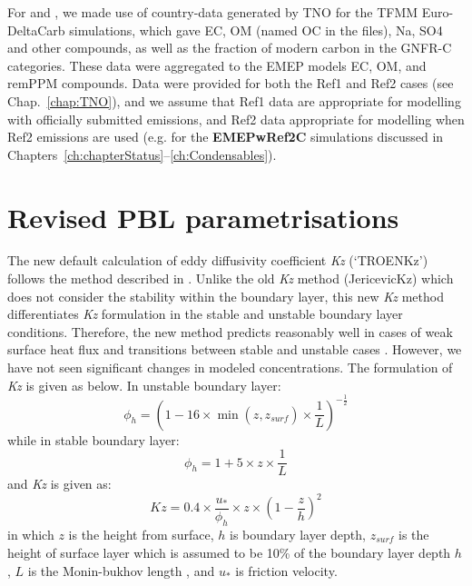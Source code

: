 
For \pmfine and \pmten, we made use of country-data generated by TNO for
the TFMM Euro-DeltaCarb simulations, which gave EC, OM (named
OC in the files), Na, SO4 and other compounds, as well as the fraction
of modern carbon in the GNFR-C categories. These data were aggregated
to the EMEP models EC, OM, and remPPM compounds. Data were provided for
both the Ref1 and Ref2 cases (see Chap.~\ref{chap:TNO}), and we assume
that Ref1 data are appropriate for modelling with officially submitted
emissions, and Ref2 data appropriate for modelling when Ref2 emissions
are used (e.g. for the \textbf{EMEPwRef2C} simulations discussed in
Chapters~\ref{ch:chapterStatus}--\ref{ch:Condensables}).



\section{Revised PBL parametrisations}
\label{sec:updateKz}

The new default calculation of eddy diffusivity coefficient \textit{Kz} (`TROENKz') follows the method described in \citet{troenkz}. Unlike the old \textit{Kz} method (JericevicKz) which does not consider the stability within the boundary layer, this new \textit{Kz} method differentiates \textit{Kz} formulation in the stable and unstable boundary layer conditions. Therefore, the new method predicts reasonably well in cases of weak surface heat flux and transitions between stable and unstable cases \citep{troenkz}. However, we have not seen significant changes in modeled concentrations. The formulation of \textit{Kz} is given as below. In unstable boundary layer:
\begin{equation}
    \phi_h = (1 - 16 \times \min(z, z_\mathit{surf}) \times \frac{1}{L})^{-\frac 1 2}
\end{equation}
while in stable boundary layer:
\begin{equation}
    \phi_h = 1 + 5 \times z \times \frac{1}{L}
\end{equation}
and \textit{Kz} is given as: 
\begin{equation}
    \mathit{Kz} = 0.4 \times \frac{u_*}{\phi_h} \times z \times (1 - \frac z h)^2
\end{equation}
in which $z$ is the height from surface, $h$ is boundary layer depth, $z_\mathit{surf}$ is the height of surface layer which is assumed to be 10\% of the boundary layer depth $h$,  $L$ is the Monin-bukhov length \citep{Garratt}, and $u_*$ is friction velocity.

